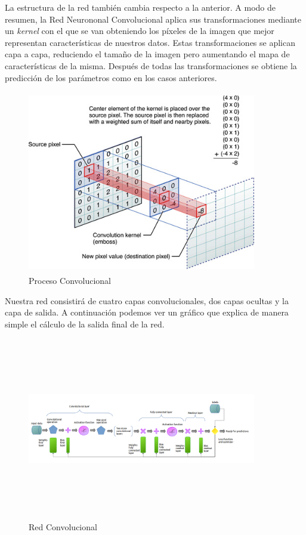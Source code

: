 \documentclass{article}
\begin{document}
La estructura de la red también cambia respecto a la anterior. A modo de resumen, la Red Neurononal Convolucional \cite{RNC} aplica sus transformaciones mediante un \textit{kernel} con el que se van obteniendo los píxeles de la imagen que mejor representan características de nuestros datos. Estas transformaciones se aplican capa a capa, reduciendo el tamaño de la imagen pero aumentando el mapa de características de la misma. Después de todas las transformaciones se obtiene la predicción de los parámetros como en los casos anteriores.

\begin{figure}[H]
  \centering
  \includegraphics[width=100mm, height=80mm]{images/conv_nn_squema.jpg}
  \caption{Proceso Convolucional}
\end{figure}

Nuestra red consistirá de cuatro capas convolucionales, dos capas ocultas y la capa de salida. A continuación podemos ver un gráfico que explica de manera simple el cálculo de la salida final de la red.

\begin{figure}[H]
  \centering
  \includegraphics[width=100mm, height=80mm]{images/conv_nn.png}
  \caption{Red Convolucional}
\end{figure}
\end{document}

